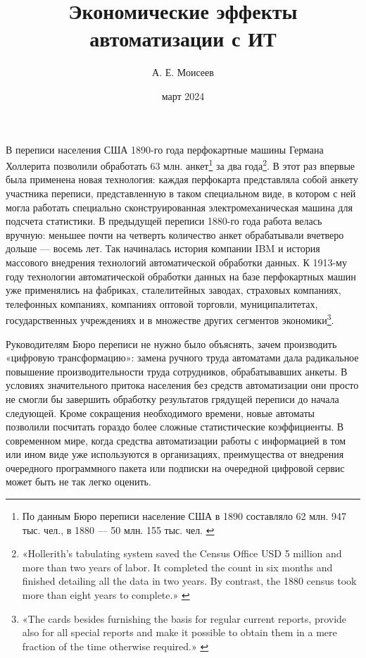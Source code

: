 \documentclass{article}
\title{Экономические эффекты автоматизации с ИТ}
\author{А. Е. Моисеев}
\date{март 2024}
\begin{document}
\maketitle

В переписи населения США 1890-го года перфокартные машины Германа Холлерита позволили обработать 63 млн. анкет\footnote{По данным Бюро переписи население США в 1890 составляло 62 млн. 947 тыс. чел., в 1880 — 50 млн. 155 тыс. чел. \cite{usCensus}} за два года\footnote{«Hollerith’s tabulating system saved the Census Office USD 5 million and more than two years of labor. It completed the count in six months and finished detailing all the data in two years. By contrast, the 1880 census took more than eight years to complete.» \cite{ibmPuchCardTabulator}}. В этот раз впервые была применена новая технология: каждая перфокарта представляла собой анкету участника переписи, представленную в таком специальном виде, в котором с ней могла работать специально сконструированная электромеханическая машина для подсчета статистики. В предыдущей переписи 1880-го года работа велась вручную: меньшее почти на четверть количество анкет обрабатывали вчетверо дольше — восемь лет. Так начиналась история компании IBM и история массового внедрения технологий автоматической обработки данных. К 1913-му году технологии автоматической обработки данных на базе перфокартных машин уже применялись на фабриках, сталелитейных заводах, страховых компаниях, телефонных компаниях, компаниях оптовой торговли, муниципалитетах, государственных учреждениях и в множестве других сегментов экономики\footnote{«The cards besides furnishing the basis for regular current reports, provide also for all special reports and make it possible to obtain them in a mere fraction of the time otherwise required.» \cite{machinery1913}}.

Руководителям Бюро переписи не нужно было объяснять, зачем производить «цифровую трансформацию»: замена ручного труда автоматами дала радикальное повышение производительности труда сотрудников, обрабатывавших анкеты. В условиях значительного притока населения без средств автоматизации они просто не смогли бы завершить обработку результатов грядущей переписи до начала следующей. Кроме сокращения необходимого времени, новые автоматы позволили посчитать гораздо более сложные статистические коэффициенты. В современном мире, когда средства автоматизации работы с информацией в том или ином виде уже используются в организациях, преимущества от внедрения очередного программного пакета или подписки на очередной цифровой сервис может быть не так легко оценить.
\end{document}
